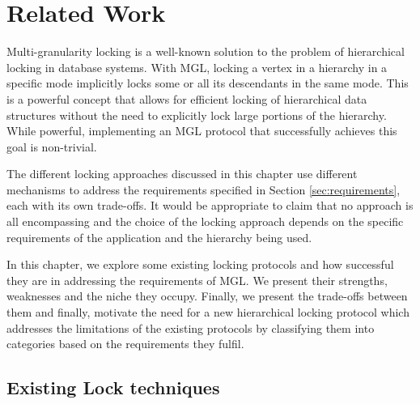 \chapter{Related Work} \label{chap:relatedwork}

\minitoc

Multi-granularity locking is a well-known solution to the problem of hierarchical locking in database systems. 
With MGL, locking a vertex in a hierarchy in a specific mode implicitly locks some or all its descendants in the same mode. 
This is a powerful concept that allows for efficient locking of hierarchical data structures without the need to explicitly lock large portions of the hierarchy.
While powerful, implementing an MGL protocol that successfully achieves this goal is non-trivial. 



The different locking approaches discussed in this chapter use different mechanisms to address the requirements specified in Section \ref{sec:requirements}, each with its own trade-offs. 
It would be appropriate to claim that no approach is all encompassing and the choice of the locking approach depends on the specific requirements of the application and the hierarchy being used. 

In this chapter, we explore some existing locking protocols and how successful they are in addressing the requirements of MGL. We present their strengths, weaknesses and the niche they occupy. Finally, we present the trade-offs between them and finally, motivate the need for a new hierarchical locking protocol which addresses the limitations of the existing protocols by classifying them into categories based on the requirements they fulfil.



\section{Existing Lock techniques}

